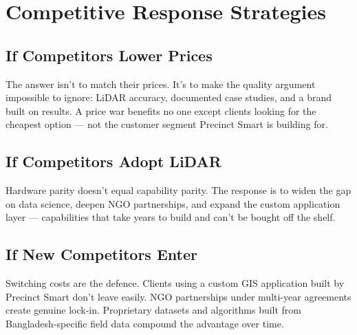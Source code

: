 \section{Competitive Response Strategies}

\subsection{If Competitors Lower Prices}

The answer isn't to match their prices. It's to make the quality argument impossible to ignore: LiDAR accuracy, documented case studies, and a brand built on results. A price war benefits no one except clients looking for the cheapest option --- not the customer segment Precinct Smart is building for.

\subsection{If Competitors Adopt LiDAR}

Hardware parity doesn't equal capability parity. The response is to widen the gap on data science, deepen NGO partnerships, and expand the custom application layer --- capabilities that take years to build and can't be bought off the shelf.

\subsection{If New Competitors Enter}

Switching costs are the defence. Clients using a custom GIS application built by Precinct Smart don't leave easily. NGO partnerships under multi-year agreements create genuine lock-in. Proprietary datasets and algorithms built from Bangladesh-specific field data compound the advantage over time.

